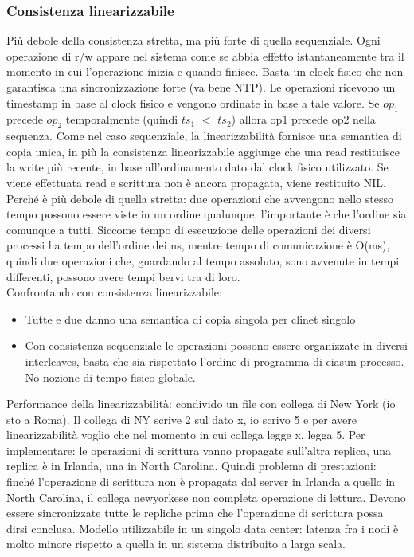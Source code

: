 \documentclass[16px]{article}
\begin{document}
\subsubsection{Consistenza linearizzabile}
Più debole della consistenza stretta, ma più forte di quella sequenziale. Ogni operazione di r/w appare nel sistema come se abbia effetto istantaneamente tra il momento in cui l'operazione inizia e quando finisce. Basta un clock fisico che non garantisca una sincronizzazione forte (va bene NTP).  Le operazioni ricevono un timestamp in base al clock fisico e vengono ordinate in base a tale valore. Se $op_1$ precede $op_2$ temporalmente (quindi $ts_1$ $<$ $ts_2$) allora op1 precede op2 nella sequenza. Come nel caso sequenziale, la linearizzabilità fornisce una semantica di copia unica, in più la consistenza linearizzabile aggiunge che una read restituisce la write più recente, in base all'ordinamento dato dal clock fisico utilizzato. Se viene effettuata read e scrittura non è ancora propagata, viene restituito NIL.\\ Perché è più debole di quella stretta: due operazioni che avvengono nello stesso tempo possono essere viste in un ordine qualunque, l'importante è che l'ordine sia comunque a tutti. Siccome tempo di esecuzione delle operazioni dei diversi processi ha tempo dell'ordine dei ns, mentre tempo di comunicazione è O(ms), quindi due operazioni che, guardando al tempo assoluto, sono avvenute in tempi differenti, possono avere tempi bervi tra di loro.\\ Confrontando con consistenza linearizzabile:
\begin{itemize}
\item Tutte e due danno una semantica di copia singola per clinet singolo
\item Con consistenza sequenziale le operazioni possono essere organizzate in diversi interleaves, basta che sia rispettato l'ordine di programma di ciasun processo. No nozione di tempo fisico globale.
\end{itemize}
Performance della linearizzabilità: condivido un file con collega di New York (io sto a Roma). Il collega di NY scrive 2 sul dato x, io scrivo 5 e per avere linearizzabilità voglio che nel momento in cui collega legge x, legga 5. Per implementare: le operazioni di scrittura vanno propagate sull'altra replica, una replica è in Irlanda, una in North Carolina. Quindi problema di prestazioni: finché l'operazione di scrittura non è propagata dal server in Irlanda a quello in North Carolina, il collega newyorkese non completa operazione di lettura. Devono essere sincronizzate tutte le repliche prima che l'operazione di scrittura possa dirsi conclusa. Modello utilizzabile in un singolo data center: latenza fra i nodi è molto minore rispetto a quella in un sistema distribuito a larga scala. 
\end{document}
